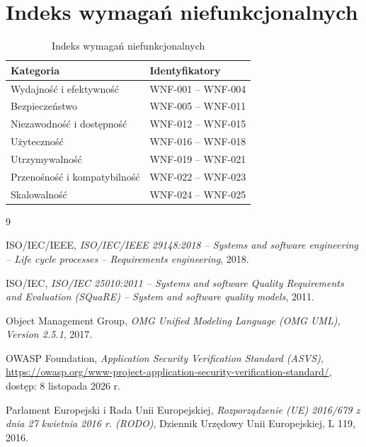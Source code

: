 \documentclass[12pt,a4paper,oneside]{report}
\begin{document}
\section{Indeks wymagań niefunkcjonalnych}
\begin{longtable}{|p{5cm}|p{8cm}|}
\caption{Indeks wymagań niefunkcjonalnych}\label{tab:indeks-wnf}\\\hline
\rowcolor{lightblue}\textbf{Kategoria} & \textbf{Identyfikatory}\\\hline
Wydajność i efektywność & WNF-001 -- WNF-004\\\hline
Bezpieczeństwo & WNF-005 -- WNF-011\\\hline
Niezawodność i dostępność & WNF-012 -- WNF-015\\\hline
Użyteczność & WNF-016 -- WNF-018\\\hline
Utrzymywalność & WNF-019 -- WNF-021\\\hline
Przenośność i kompatybilność & WNF-022 -- WNF-023\\\hline
Skalowalność & WNF-024 -- WNF-025\\\hline
\end{longtable}


\begin{thebibliography}{9}

ISO/IEC/IEEE,
\textit{ISO/IEC/IEEE 29148:2018 -- Systems and software engineering -- Life cycle processes -- Requirements engineering},
2018.

ISO/IEC,
\textit{ISO/IEC 25010:2011 -- Systems and software Quality Requirements and Evaluation (SQuaRE) -- System and software quality models},
2011.

Object Management Group,
\textit{OMG Unified Modeling Language (OMG UML), Version 2.5.1},
2017.

OWASP Foundation,
\textit{Application Security Verification Standard (ASVS)},
\url{https://owasp.org/www-project-application-security-verification-standard/},
dostęp: 8 listopada 2026 r.

Parlament Europejski i Rada Unii Europejskiej,
\textit{Rozporządzenie (UE) 2016/679 z dnia 27 kwietnia 2016 r. (RODO)},
Dziennik Urzędowy Unii Europejskiej, L 119, 2016.

\end{thebibliography}
\end{document}
